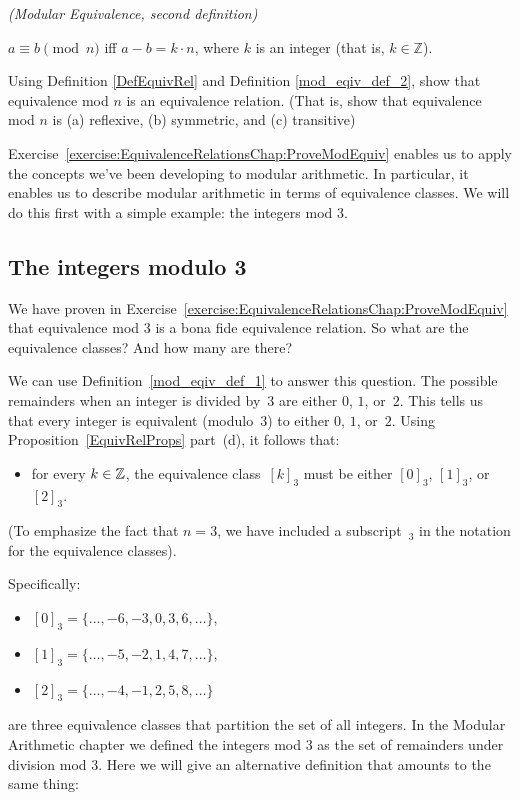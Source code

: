 \begin{defn}\label{mod_eqiv_def_2} \emph{(Modular Equivalence, second definition)}

\medskip
$a \equiv b \pmod{n}$ iff $a - b = k \cdot n$, where $k$ is an integer (that is, $k \in  {\mathbb Z}$). 
\end{defn}

\begin{exercise}\label{exercise:EquivalenceRelationsChap:ProveModEquiv}
Using Definition \ref{DefEquivRel} and Definition  \ref{mod_eqiv_def_2}, show that equivalence mod $n$ is an equivalence relation. (That is, show that equivalence mod $n$ is (a) reflexive, (b) symmetric, and (c) transitive)
\end{exercise}

Exercise~\ref{exercise:EquivalenceRelationsChap:ProveModEquiv} enables us to apply the concepts we've been developing to modular arithmetic. In particular, it enables us to describe modular arithmetic in terms of equivalence classes. We will do this first with a simple example: the integers mod 3.

\subsection{The integers modulo 3}

We have proven in Exercise~\ref{exercise:EquivalenceRelationsChap:ProveModEquiv} that equivalence mod 3 is a bona fide equivalence relation. So what are the equivalence classes? And how many are there?
\medskip

We can use Definition~\ref{mod_eqiv_def_1} to answer this question. The possible remainders when an integer is divided by~$3$ are either $0$, $1$, or~$2$. This tells us that  every integer is equivalent (modulo~$3$) to either $0$, $1$, or~$2$. Using Proposition~\ref{EquivRelProps} part~(d), it follows that:
\begin{itemize}
\item[] for every $k \in \mathbb{Z}$, the equivalence class~$[k]_3$ must be either $[0]_3$, $[1]_3$, or~$[2]_3$.
\end{itemize}
(To emphasize the fact that $n = 3$, we have included a subscript~${}_3$ in the notation for the equivalence classes).

\noindent
Specifically:
\begin{itemize}
\item[]
$[0]_3 = \{ \ldots, -6, -3, 0, 3, 6, \ldots \}$,
\item[]
$[1]_3 = \{ \ldots, -5, -2, 1, 4, 7, \ldots \}$,
\item[]
$[2]_3 = \{ \ldots, -4, -1, 2, 5, 8, \ldots \}$
\end{itemize}
are three equivalence classes that partition the set of all  integers.
In the Modular Arithmetic chapter we defined the integers mod 3 as the set of remainders under division mod 3. Here we will give an alternative definition that amounts to the same thing:

